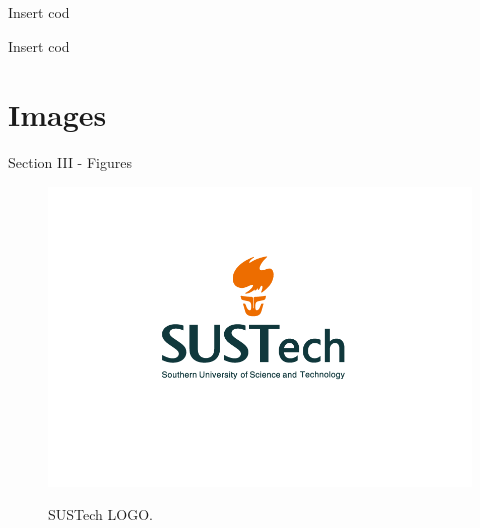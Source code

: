 \documentclass{libs/SUSTech_format}
\begin{document}

\begin{frame}{Insert cod}
    
\end{frame}

\begin{frame}{Insert cod}
    
\end{frame}


\section{Images}
\begin{frame}{Section III - Figures}
    \begin{figure}
        \centering
        \caption{SUSTech LOGO.}
        \includegraphics[scale=0.3]{libs/LOGO.png}
        \label{fig:ufc_emblem}
    \end{figure}
\end{frame}
\end{document}
